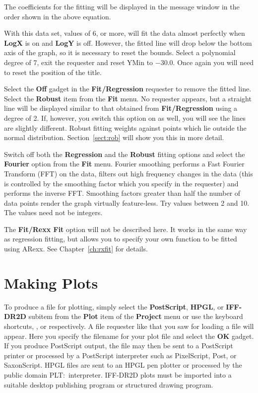 The coefficients for the fitting will be displayed in the message window in the 
order shown  in the above equation.

With this data set, values of 6, or more, will fit the data almost perfectly when 
{\bf LogX} is on and {\bf LogY} is off.
However, the fitted line will drop below the bottom axis of the graph, so it is 
necessary to reset the bounds. Select a polynomial degree of 7, exit the requester 
and reset YMin to $-30.0$. Once again you will need to reset the position of the 
title.

Select the {\bf Off} gadget in the {\bf Fit/Regression} requester to remove the 
fitted line. Select the {\bf Robust} item
from the {\bf Fit} menu. No requester appears, 
but a straight line will be displayed similar to that obtained from 
{\bf Fit/Regression} using a degree of 2.
If, however, you switch this option on as well, you will see the lines are 
slightly different. Robust fitting weights against points which lie outside the 
normal distribution. Section~\ref{sect:rob} will show you this in more detail.

Switch off both the {\bf Regression} and the {\bf Robust} fitting options and 
select the {\bf Fourier} option
from the {\bf Fit} menu. Fourier smoothing 
performs a Fast Fourier Transform (FFT) on the data, filters out high frequency 
changes in the data (this is controlled by the smoothing factor which you 
specify in the requester) and performs the inverse FFT. Smoothing factors greater 
than half the number of data points render the graph virtually feature-less. Try 
values between 2 and 10. The values need not be integers.

The {\bf Fit/Rexx Fit} option will not be described here. It works in the same way 
as regression fitting, but allows you to specify your own function to be fitted 
using ARexx. See Chapter~\ref{ch:rxfit} for details.








\section{Making Plots}
To produce a file for plotting, simply select
the {\bf PostScript}, {\bf HPGL}, or {\bf IFF-DR2D} subitem from the {\bf Plot} 
item of the {\bf Project} menu  or use the keyboard shortcuts, ,  or 
 respectively.
A file requester like that you saw for loading a file will appear. Here you 
specify the filename for your plot file and select the {\bf OK} gadget. 
If you produce 
PostScript output, the file may then be sent to a PostScript printer or processed 
by a PostScript interpreter such as PixelScript, Post, or SaxonScript. HPGL files 
are sent to an HPGL pen plotter or processed by the public domain PLT:\ interpreter.
IFF-DR2D plots must be imported into a suitable desktop publishing program or 
structured drawing program.

